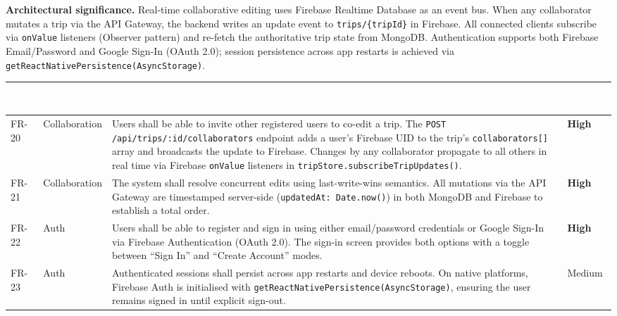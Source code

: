 \documentclass[12pt, a4paper]{article}
\newcommand{\reqid}[1]{\textsc{\small #1}}
\newcommand{\high}{\textbf{High}}
\newcommand{\medium}{Medium}
\newcommand{\thcell}[1]{\textcolor{white}{\textbf{\small #1}}}
\begin{document}
\begin{tcolorbox}[notebox]
  \textbf{Architectural significance.} Real-time collaborative editing uses Firebase Realtime Database as an event bus. When any collaborator mutates a trip via the API Gateway, the backend writes an update event to \texttt{trips/\{tripId\}} in Firebase. All connected clients subscribe via \texttt{onValue} listeners (Observer pattern) and re-fetch the authoritative trip state from MongoDB. Authentication supports both Firebase Email/Password and Google Sign-In (OAuth 2.0); session persistence across app restarts is achieved via \texttt{getReactNativePersistence(AsyncStorage)}.
\end{tcolorbox}

\vspace{0.4em}
\begin{longtable}{C{1.6cm} C{2.0cm} L{8.2cm} C{1.8cm}}
\toprule
{}
\thcell{Req ID} & \thcell{Category} & \thcell{Requirement} & \thcell{Priority} \\
\midrule
\endhead
\bottomrule
\endfoot

\reqid{FR-20} & Collaboration &
Users shall be able to invite other registered users to co-edit a trip. The \texttt{POST /api/trips/:id/collaborators} endpoint adds a user's Firebase UID to the trip's \texttt{collaborators[]} array and broadcasts the update to Firebase. Changes by any collaborator propagate to all others in real time via Firebase \texttt{onValue} listeners in \texttt{tripStore.subscribeTripUpdates()}. &
\high \\

\reqid{FR-21} & Collaboration &
The system shall resolve concurrent edits using last-write-wins semantics. All mutations via the API Gateway are timestamped server-side (\texttt{updatedAt: Date.now()}) in both MongoDB and Firebase to establish a total order. &
\high \\

\reqid{FR-22} & Auth &
Users shall be able to register and sign in using either email/password credentials or Google Sign-In via Firebase Authentication (OAuth 2.0). The sign-in screen provides both options with a toggle between ``Sign In'' and ``Create Account'' modes. &
\high \\

\reqid{FR-23} & Auth &
Authenticated sessions shall persist across app restarts and device reboots. On native platforms, Firebase Auth is initialised with \texttt{getReactNativePersistence(AsyncStorage)}, ensuring the user remains signed in until explicit sign-out. &
\medium \\

\end{longtable}
\end{document}
